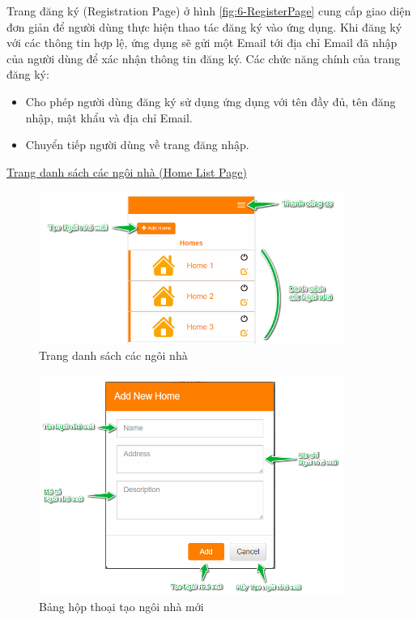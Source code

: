 \documentclass[12pt,a4paper,oneside]{extbook}
\begin{document}
Trang đăng ký (Registration Page) ở hình \ref{fig:6-RegisterPage} cung cấp giao diện đơn giản để người dùng thực hiện thao tác đăng ký vào ứng dụng. Khi đăng ký với các thông tin hợp lệ, ứng dụng sẽ gửi một Email tới địa chỉ Email đã nhập của người dùng để xác nhận thông tin đăng ký. Các chức năng chính của trang đăng ký:

\begin{itemize}[topsep=1mm,itemsep=-0.5mm]
\item Cho phép người dùng đăng ký sử dụng ứng dụng với tên đầy đủ, tên đăng nhập, mật khẩu và địa chỉ Email.
\item Chuyển tiếp người dùng về trang đăng nhập.
\vspace{1mm}
\end{itemize}

\underline{Trang danh sách các ngôi nhà (Home List Page)}

\begin{figure}[h]
  \centering
     \includegraphics[width=10cm]{6-HomeListPage}
  \caption{Trang danh sách các ngôi nhà}\label{fig:6-HomeListPage}
\end{figure}

\begin{figure}[h]
  \centering
     \includegraphics[width=10cm]{6-AddHome}
  \caption{Bảng hộp thoại tạo ngôi nhà mới}\label{fig:6-AddHome}
\end{figure}
\end{document}
